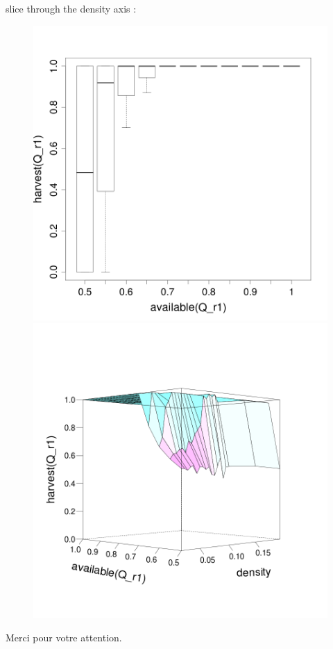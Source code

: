 \documentclass[8pt, handout=show,notes=show]{beamer}
\begin{document}
\begin{frame}{ slice through the density axis : }
\begin{figure}[H]
\includegraphics[width=\imgSize]{images/harvestr1_r1_density-60.png}
\includegraphics[width=\imgSize]{images/R1_median}

\end{figure}
\end{frame}
\begin{frame}%
\begin{center}
Merci pour votre attention.
\end{center}
\end{frame}
\end{document}
